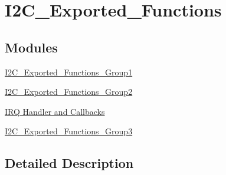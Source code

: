 \hypertarget{group___i2_c___exported___functions}{\section{I2\-C\-\_\-\-Exported\-\_\-\-Functions}
\label{group___i2_c___exported___functions}
}
\subsection*{Modules}
\begin{DoxyCompactItemize}
\item 
\hyperlink{group___i2_c___exported___functions___group1}{I2\-C\-\_\-\-Exported\-\_\-\-Functions\-\_\-\-Group1}
\item 
\hyperlink{group___i2_c___exported___functions___group2}{I2\-C\-\_\-\-Exported\-\_\-\-Functions\-\_\-\-Group2}
\item 
\hyperlink{group___i2_c___i_r_q___handler__and___callbacks}{I\-R\-Q Handler and Callbacks}
\item 
\hyperlink{group___i2_c___exported___functions___group3}{I2\-C\-\_\-\-Exported\-\_\-\-Functions\-\_\-\-Group3}
\end{DoxyCompactItemize}


\subsection{Detailed Description}
